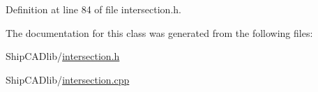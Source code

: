 Definition at line 84 of file intersection.\-h.



The documentation for this class was generated from the following files\-:\begin{DoxyCompactItemize}
\item 
Ship\-C\-A\-Dlib/\hyperlink{intersection_8h}{intersection.\-h}\item 
Ship\-C\-A\-Dlib/\hyperlink{intersection_8cpp}{intersection.\-cpp}\end{DoxyCompactItemize}
